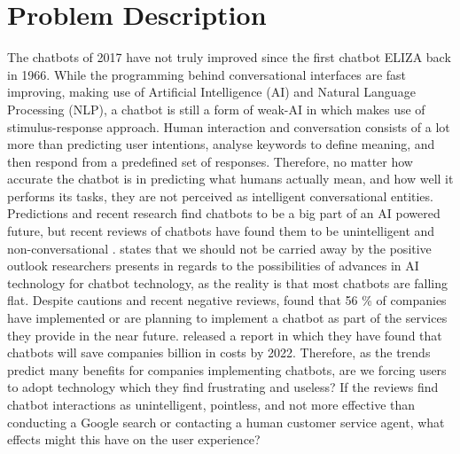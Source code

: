 \section{Problem Description}
The chatbots of 2017 have not truly improved since the first chatbot ELIZA back in 1966. While the programming behind conversational interfaces are fast improving, making use of Artificial Intelligence (AI) and Natural Language Processing (NLP), a chatbot is still a form of weak-AI in which makes use of stimulus-response approach. Human interaction and conversation consists of a lot more than predicting user intentions, analyse keywords to define meaning, and then respond from a predefined set of responses. Therefore, no matter how accurate the chatbot is in predicting what humans actually mean, and how well it performs its tasks, they are not perceived as intelligent conversational entities. Predictions and recent research find chatbots to be a big part of an AI powered future, but recent reviews of chatbots have found them to be unintelligent and non-conversational \citep{stokke2017,orf2017,piltch2017,vincent2017,boutin2017}. \cite{piltch2017} states that we should not be carried away by the positive outlook researchers presents in regards to the possibilities of advances in AI technology for chatbot technology, as the reality is that most chatbots are falling flat. Despite cautions and recent negative reviews, \cite{forrester2017}found that 56 \% of companies have implemented or are planning to implement a chatbot as part of the services they provide in the near future. \cite{juniper2017} released a report in which they have found that chatbots will save companies  billion in costs by 2022. Therefore, as the trends predict many benefits for companies implementing chatbots, are we forcing users to adopt technology which they find frustrating and useless? If the reviews find chatbot interactions as unintelligent, pointless, and not more effective than conducting a Google search or contacting a human customer service agent, what effects might this have on the user experience?

\vspace{5mm} %

